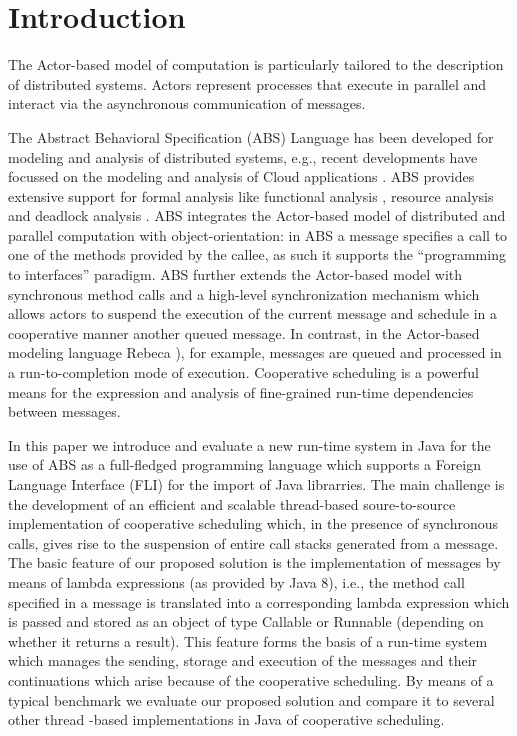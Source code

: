 \section{Introduction}

The Actor-based model of computation \cite{Agha} is particularly tailored to the description of distributed systems.  Actors represent processes that execute in parallel and interact via the asynchronous communication of messages.


The  Abstract Behavioral Specification (ABS) \cite{abs}  Language has been developed
for modeling and analysis of distributed systems, e.g., recent developments
have focussed on the modeling and analysis of Cloud applications \cite{Albert}.
ABS provides extensive support for  formal analysis like functional analysis \cite{KeY}, resource analysis \cite{saco}  and deadlock analysis \cite{dead}.
 ABS integrates the Actor-based model of distributed and parallel computation with object-orientation:
in ABS a message specifies a  call to one of the methods provided by the callee,
as such it supports the ``programming to interfaces'' paradigm.
ABS further  extends the Actor-based model with  synchronous method calls and a high-level synchronization mechanism which allows actors to suspend the
execution of the current message and schedule in a cooperative manner another
queued message. 
In contrast, in the Actor-based modeling language Rebeca \cite{Sirjani}), for example,
messages are queued and processed in a run-to-completion mode of execution.
Cooperative scheduling   is a powerful means for the expression and analysis
of fine-grained run-time dependencies between messages.



In this paper we introduce  and evaluate a new run-time system in Java for  the use of ABS as a full-fledged programming language which supports a Foreign Language Interface (FLI) for the import of Java librarries. 
The main challenge is the development of an efficient and scalable  thread-based soure-to-source implementation of cooperative scheduling which, in the presence of synchronous calls,   gives rise to the suspension of  entire call stacks generated
from a message.
The basic feature of our proposed solution is the implementation of messages by means of lambda expressions (as provided by Java 8), i.e., the method call specified in a message
is translated into a corresponding lambda expression which is passed and stored as
an object of type Callable or Runnable (depending on whether it returns  a result).
This  feature forms  the basis of a run-time system which manages
the sending, storage and execution of  the messages and their continuations
which arise because of the cooperative scheduling.
By means of a typical benchmark we evaluate our proposed solution and compare it
to several other thread -based implementations in Java of cooperative scheduling.

